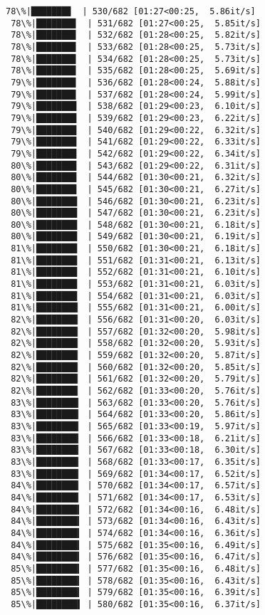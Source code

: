 \documentclass[11pt]{article}
\begin{document}
\begin{Verbatim}[commandchars=\\\{\}]
 78\%|███████▊  | 530/682 [01:27<00:25,  5.86it/s]
 78\%|███████▊  | 531/682 [01:27<00:25,  5.85it/s]
 78\%|███████▊  | 532/682 [01:28<00:25,  5.82it/s]
 78\%|███████▊  | 533/682 [01:28<00:25,  5.73it/s]
 78\%|███████▊  | 534/682 [01:28<00:25,  5.73it/s]
 78\%|███████▊  | 535/682 [01:28<00:25,  5.69it/s]
 79\%|███████▊  | 536/682 [01:28<00:24,  5.88it/s]
 79\%|███████▊  | 537/682 [01:28<00:24,  5.99it/s]
 79\%|███████▉  | 538/682 [01:29<00:23,  6.10it/s]
 79\%|███████▉  | 539/682 [01:29<00:23,  6.22it/s]
 79\%|███████▉  | 540/682 [01:29<00:22,  6.32it/s]
 79\%|███████▉  | 541/682 [01:29<00:22,  6.33it/s]
 79\%|███████▉  | 542/682 [01:29<00:22,  6.34it/s]
 80\%|███████▉  | 543/682 [01:29<00:22,  6.31it/s]
 80\%|███████▉  | 544/682 [01:30<00:21,  6.32it/s]
 80\%|███████▉  | 545/682 [01:30<00:21,  6.27it/s]
 80\%|████████  | 546/682 [01:30<00:21,  6.23it/s]
 80\%|████████  | 547/682 [01:30<00:21,  6.23it/s]
 80\%|████████  | 548/682 [01:30<00:21,  6.18it/s]
 80\%|████████  | 549/682 [01:30<00:21,  6.19it/s]
 81\%|████████  | 550/682 [01:30<00:21,  6.18it/s]
 81\%|████████  | 551/682 [01:31<00:21,  6.13it/s]
 81\%|████████  | 552/682 [01:31<00:21,  6.10it/s]
 81\%|████████  | 553/682 [01:31<00:21,  6.03it/s]
 81\%|████████  | 554/682 [01:31<00:21,  6.03it/s]
 81\%|████████▏ | 555/682 [01:31<00:21,  6.00it/s]
 82\%|████████▏ | 556/682 [01:31<00:20,  6.03it/s]
 82\%|████████▏ | 557/682 [01:32<00:20,  5.98it/s]
 82\%|████████▏ | 558/682 [01:32<00:20,  5.93it/s]
 82\%|████████▏ | 559/682 [01:32<00:20,  5.87it/s]
 82\%|████████▏ | 560/682 [01:32<00:20,  5.85it/s]
 82\%|████████▏ | 561/682 [01:32<00:20,  5.79it/s]
 82\%|████████▏ | 562/682 [01:33<00:20,  5.76it/s]
 83\%|████████▎ | 563/682 [01:33<00:20,  5.76it/s]
 83\%|████████▎ | 564/682 [01:33<00:20,  5.86it/s]
 83\%|████████▎ | 565/682 [01:33<00:19,  5.97it/s]
 83\%|████████▎ | 566/682 [01:33<00:18,  6.21it/s]
 83\%|████████▎ | 567/682 [01:33<00:18,  6.30it/s]
 83\%|████████▎ | 568/682 [01:33<00:17,  6.35it/s]
 83\%|████████▎ | 569/682 [01:34<00:17,  6.52it/s]
 84\%|████████▎ | 570/682 [01:34<00:17,  6.57it/s]
 84\%|████████▎ | 571/682 [01:34<00:17,  6.53it/s]
 84\%|████████▍ | 572/682 [01:34<00:16,  6.48it/s]
 84\%|████████▍ | 573/682 [01:34<00:16,  6.43it/s]
 84\%|████████▍ | 574/682 [01:34<00:16,  6.36it/s]
 84\%|████████▍ | 575/682 [01:35<00:16,  6.49it/s]
 84\%|████████▍ | 576/682 [01:35<00:16,  6.47it/s]
 85\%|████████▍ | 577/682 [01:35<00:16,  6.48it/s]
 85\%|████████▍ | 578/682 [01:35<00:16,  6.43it/s]
 85\%|████████▍ | 579/682 [01:35<00:16,  6.39it/s]
 85\%|████████▌ | 580/682 [01:35<00:16,  6.37it/s]

\end{Verbatim}
\end{document}
